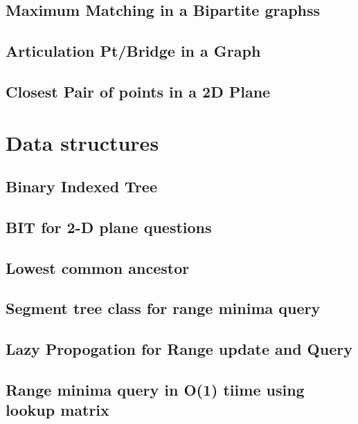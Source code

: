 \subsection{Maximum Matching in a Bipartite graphss}
\raggedbottom
\hrulefill
\subsection{Articulation Pt/Bridge in a Graph}
\raggedbottom
\hrulefill
\subsection{Closest Pair of points in a 2D Plane}
\raggedbottom
\hrulefill

\section{Data structures}
\subsection{Binary Indexed Tree}
\raggedbottom
\hrulefill
\subsection{BIT for 2-D plane questions}
\raggedbottom
\hrulefill
\subsection{Lowest common ancestor}
\raggedbottom
\hrulefill
\subsection{Segment tree class for range minima query}
\raggedbottom
\hrulefill
\subsection{Lazy Propogation for Range update and Query}
\raggedbottom
\hrulefill
\subsection{Range minima query in O(1) tiime using lookup matrix}
\raggedbottom
\hrulefill

